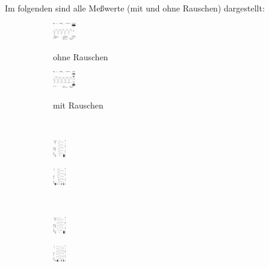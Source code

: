 Im folgenden sind alle Meßwerte (mit und ohne Rauschen) dargestellt:
\begin{figure}
\caption{$U_{out}$}
\centering
\begin{subfigure}{0.48\textwidth}
\centering
\caption{ohne Rauschen}
\includegraphics[height=0.75cm]{graphics/ALL0031/F0031TEK.jpg}
\label{fig:phi0o}
\end{subfigure}
\begin{subfigure}{0.48\textwidth}
\centering
\caption{mit Rauschen}
\includegraphics[height=0.75cm]{graphics/ALL0039/F0039TEK.jpg}
\label{fig:phi0m}
\end{subfigure}

\\

\begin{subfigure}{0.48\textwidth}
\centering
\includegraphics[height=0.75cm]{graphics/ALL0032/F0032TEK.jpg}
\label{fig:phi135o}
\end{subfigure}
\begin{subfigure}{0.48\textwidth}
\centering
\includegraphics[height=0.75cm]{graphics/ALL0040/F0040TEK.jpg}
\label{fig:phi135m}
\end{subfigure}

\\

\begin{subfigure}{0.48\textwidth}
\centering
\includegraphics[height=0.75cm]{graphics/ALL0033/F0033TEK.jpg}
\label{fig:phi90o}
\end{subfigure}
\begin{subfigure}{0.48\textwidth}
\centering
\includegraphics[height=0.75cm]{graphics/ALL0041/F0041TEK.jpg}
\label{fig:phi90m}
\end{subfigure}



\end{figure}
